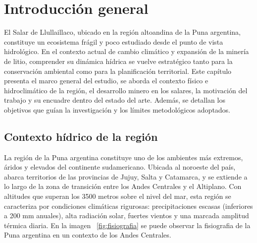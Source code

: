 
\chapter{Introducción general} %

\label{Chapter1} %
\label{IntroGeneral}


\newcommand{\keyword}[1]{\textbf{#1}}
\newcommand{\tabhead}[1]{\textbf{#1}}
\newcommand{\code}[1]{\texttt{#1}}
\newcommand{\file}[1]{\texttt{\bfseries#1}}
\newcommand{\option}[1]{\texttt{\itshape#1}}
\newcommand{\grados}{$^{\circ}$}




El Salar de Llullaillaco, ubicado en la región altoandina de la Puna argentina, constituye un ecosistema frágil y poco estudiado desde el punto de vista hidrológico. En el contexto actual de cambio climático y expansión de la minería de litio, comprender su dinámica hídrica se vuelve estratégico tanto para la conservación ambiental como para la planificación territorial. Este capítulo presenta el marco general del estudio, se aborda el contexto físico e hidroclimático de la región, el desarrollo minero en los salares, la motivación del trabajo y su encuadre dentro del estado del arte. Además, se detallan los objetivos que guían la investigación y los límites metodológicos adoptados.


\section{Contexto hídrico de la región}


La región de la Puna argentina constituye uno de los ambientes más extremos, áridos y elevados del continente sudamericano. Ubicada al noroeste del país, abarca territorios de las provincias de Jujuy, Salta y Catamarca, y se extiende a lo largo de la zona de transición entre los Andes Centrales y el Altiplano. Con altitudes que superan los 3500 metros sobre el nivel del mar, esta región se caracteriza por condiciones climáticas rigurosas: precipitaciones escasas (inferiores a 200 mm anuales), alta radiación solar, fuertes vientos y una marcada amplitud térmica diaria. En la imagen ~\ref{fig:fisiografia} se puede observar la fisiografia de la Puna argentina en un contexto de los Andes Centrales. 

